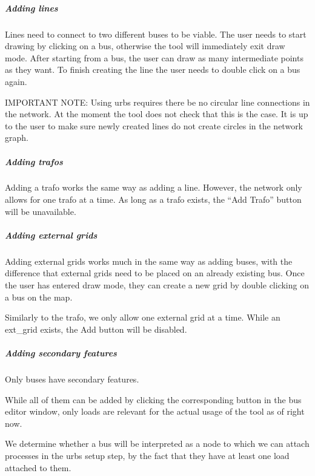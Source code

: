 \documentclass[letterpaper,10pt,english]{sphinxmanual}
\begin{document}
\subparagraph{Adding lines}
\label{\detokenize{docs_gui/usage/network_editor:adding-lines}}
\begin{DUlineblock}{0em}
\item[] Lines need to connect to two different buses to be viable. The user needs to start drawing by clicking on a bus, otherwise the tool will immediately exit draw mode.
After starting from a bus, the user can draw as many intermediate points as they want. To finish creating the line the user needs to double click on a bus again.
\item[] IMPORTANT  NOTE: Using urbs requires there be no circular line connections in the network. At the moment the tool does not check that this is the case. It is up to the user
to make sure newly created lines do not create circles in the network graph.
\end{DUlineblock}


\subparagraph{Adding trafos}
\label{\detokenize{docs_gui/usage/network_editor:adding-trafos}}
\begin{DUlineblock}{0em}
\item[] Adding a trafo works the same way as adding a line. However, the network only allows for one trafo at a time. As long as a trafo exists,
the “Add Trafo” button will be unavailable.
\end{DUlineblock}


\subparagraph{Adding external grids}
\label{\detokenize{docs_gui/usage/network_editor:adding-external-grids}}
\begin{DUlineblock}{0em}
\item[] Adding external grids works much in the same way as adding buses, with the difference that external grids need to be placed on an already existing bus.
Once the user has entered draw mode, they can create a new grid by double clicking on a bus on the map.
\item[] Similarly to the trafo, we only allow one external grid at a time. While an ext\_grid exists, the Add button will be disabled.
\end{DUlineblock}


\subparagraph{Adding secondary features}
\label{\detokenize{docs_gui/usage/network_editor:adding-secondary-features}}
\begin{DUlineblock}{0em}
\item[] Only buses have secondary features.
\item[] While all of them can be added by clicking the corresponding button in the bus editor window, only loads are relevant for the actual usage of the tool
as of right now.
\item[] We determine whether a bus will be interpreted as a node to which we can attach processes in the urbs setup step, by the fact that they have at least
one load attached to them.
\end{DUlineblock}
\end{document}
